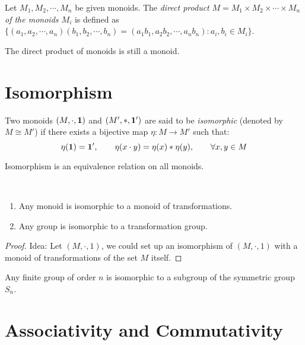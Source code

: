 \begin{definition} Let $M_1,M_2,\cdots ,M_n$ be given monoids. The \textit{direct product} $M = M_1 \times  M_2 \times \cdots \times M_n$ \textit{of the monoids $M_i$} is defined as $\{ (a_1,a_2,\cdots ,a_n)(b_1,b_2,\cdots ,b_n) = (a_1b_1,a_2b_2,\cdots ,a_nb_n) : a_i,b_i \in M_i \}$.
\end{definition}

\begin{remark}
The direct product of monoids is still a monoid.
\end{remark}

\newpage
\section{Isomorphism} \label{sec:}

\begin{definition}[Isomorphism]
Two monoids $(M,\cdot, \mathbf{1})$ and $(M', *, \mathbf{1}')$ are said to be \textit{isomorphic} (denoted by $M \cong M'$) if there exists a bijective map $\eta: M \to M'$ such that:
$$
\eta(\mathbf{1}) = \mathbf{1}', \qquad \eta(x\cdot y) = \eta(x) * \eta(y), \qquad \forall x,y \in M
$$
\end{definition}

\begin{prop}
Isomorphism is an equivalence relation on all monoids.
\end{prop}

\begin{theorem} ~
\begin{enumerate}
    \item Any monoid is isomorphic to a monoid of transformations.
    \item Any group is isomorphic to a transformation group.
\end{enumerate}
\end{theorem}
\begin{proof}
Idea: Let $(M,\cdot, 1)$, we could set up an isomorphism of $(M,\cdot, 1)$ with a monoid of transformations of the set $M$ itself.
\end{proof}
\begin{corollary}
Any finite group of order $n$ is isomorphic to a subgroup of the symmetric group $S_n$.
\end{corollary}


\newpage

\section{Associativity and Commutativity} \label{sec:}

